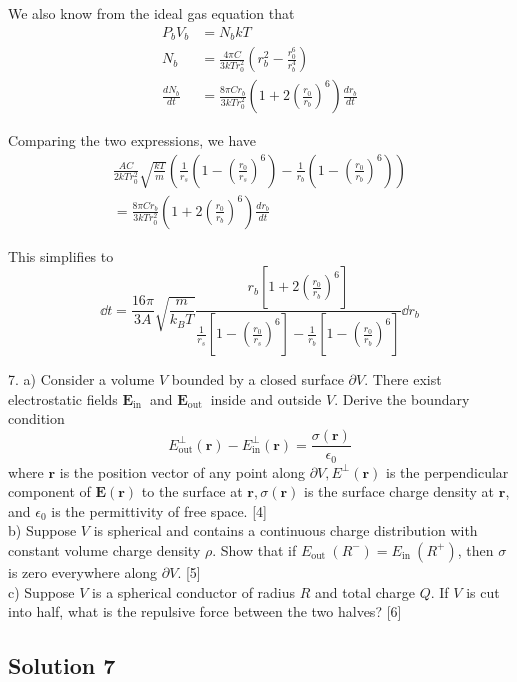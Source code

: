 \documentclass{article}
\begin{document}
We also know from the ideal gas equation that
\begin{align}
    P_b V_b &= N_b kT \\
    N_b &= \frac{4\pi C}{3kTr_0^2} \left(r_b^2 - \frac{r_0^6}{r_b^4} \right) \\
    \frac{dN_b}{dt} &= \frac{8\pi C r_b}{3kTr_0^2} \left(1+2\left(\frac{r_0}{r_b}\right)^6\right) \frac{dr_b}{dt}
\end{align}

Comparing the two expressions, we have
\begin{multline}
 \frac{AC}{2kT r_0^2} \sqrt{\frac{kT}{m}} \left(         \frac{1}{r_s} \left( 1 - \left(\frac{r_0}{r_s}\right)^6 \right) -
        \frac{1}{r_b} \left( 1 - \left(\frac{r_0}{r_b}\right)^6 \right)
    \right) \\
    =\frac{8\pi C r_b}{3kTr_0^2} \left(1+2\left(\frac{r_0}{r_b}\right)^6\right) \frac{dr_b}{dt} 
\end{multline}

This simplifies to
\[\dd{t} = \frac{16 \pi}{3 A} 
\sqrt{\frac{m}{k_{B} T}}
\frac{r_{b}\left[1+2\left(\frac{r_{0}}{r_{b}}\right)^{6}\right]}
{\frac{1}{r_{s}}\left[1-\left(\frac{r_{0}}{r_{s}}\right)^{6}\right]-\frac{1}{r_{b}}\left[1-\left(\frac{r_{0}}{r_{b}}\right)^{6}\right]} 
\dd{r_b}
\]

7. a) Consider a volume $V$ bounded by a closed surface $\partial V$. There exist electrostatic fields $\mathbf{E}_{\text {in }}$ and $\mathbf{E}_{\text {out }}$ inside and outside $V$. Derive the boundary condition
$$
E_{\mathrm{out}}^{\perp}(\mathbf{r})-E_{\mathrm{in}}^{\perp}(\mathbf{r})=\frac{\sigma(\mathbf{r})}{\epsilon_{0}}
$$
where $\mathbf{r}$ is the position vector of any point along $\partial V, E^{\perp}(\mathbf{r})$ is the perpendicular component of $\mathbf{E}(\mathbf{r})$ to the surface at $\mathbf{r}, \sigma(\mathbf{r})$ is the surface charge density at $\mathbf{r}$, and $\epsilon_{0}$ is the permittivity of free space. [4] \\
b) Suppose $V$ is spherical and contains a continuous charge distribution with constant volume charge density $\rho$. Show that if $E_{\text {out }}\left(R^{-}\right)=E_{\text {in }}\left(R^{+}\right)$, then $\sigma$ is zero everywhere along $\partial V$. [5] \\
c) Suppose $V$ is a spherical conductor of radius $R$ and total charge $Q .$ If $V$ is cut into half, what is the repulsive force between the two halves? [6] 

\subsection{Solution 7}
\end{document}
